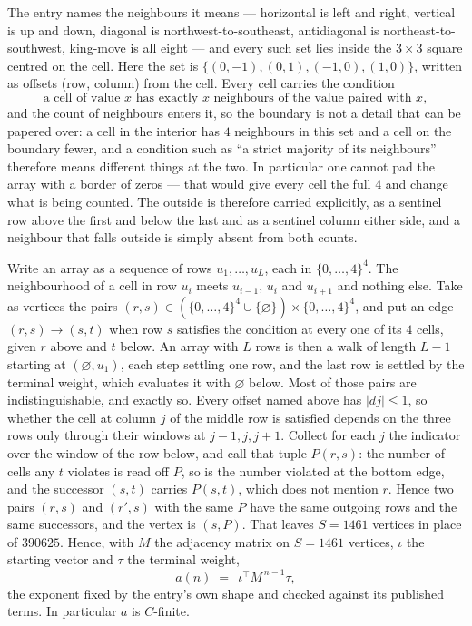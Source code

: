 \documentclass[11pt,a4paper]{article}
\theoremstyle{plain}
\theoremstyle{definition}
\begin{document}
The entry names the neighbours it means --- horizontal is left and right, vertical is up and
down, diagonal is northwest-to-southeast, antidiagonal is northeast-to-southwest, king-move is
all eight --- and every such set lies inside the $3\times3$ square centred on the cell. Here
the set is $\{(0,-1), (0,1), (-1,0), (1,0)\}$, written as offsets (row, column) from the cell. Every cell carries
the condition
\[
\text{a cell of value }x\text{ has exactly }x\text{ neighbours of the value paired with }x,
\]
and the count of neighbours enters it, so the boundary is not a detail that can be papered
over: a cell in the interior has $4$ neighbours in this set and a cell on the boundary
fewer, and a condition such as ``a strict majority of its neighbours'' therefore means
different things at the two. In particular one cannot pad the array with a border of zeros ---
that would give every cell the full $4$ and change what is being counted. The outside is
therefore carried
explicitly, as a sentinel row above the first and below the last and as a sentinel column
either side, and a neighbour that falls outside is simply absent from both counts.

Write an array as a sequence of rows $u_1,\dots,u_L$, each in
$\{0,\dots,4\}^{4}$. The neighbourhood of a cell in row $u_i$ meets $u_{i-1}$,
$u_i$ and $u_{i+1}$ and nothing else. Take as vertices the pairs
$(r,s)\in(\{0,\dots,4\}^{4}\cup\{\varnothing\})\times\{0,\dots,4\}^{4}$,
and put an edge $(r,s)\to(s,t)$ when row $s$ satisfies the condition at every one of its
$4$ cells, given $r$ above and $t$ below. An array with $L$ rows is then a walk of length
$L-1$ starting at $(\varnothing,u_1)$, each step settling one row, and the last row is
settled by the terminal weight, which evaluates it with $\varnothing$ below. Most of those pairs are indistinguishable, and exactly so. Every offset named above has $|dj|\le 1$, so whether the cell at column $j$ of the middle row is satisfied depends on the three rows only through their windows at $j-1,j,j+1$. Collect for each $j$ the indicator over the window of the row below, and call that tuple $P(r,s)$: the number of cells any $t$ violates is read off $P$, so is the number violated at the bottom edge, and the successor $(s,t)$ carries $P(s,t)$, which does not mention $r$. Hence two pairs $(r,s)$ and $(r',s)$ with the same $P$ have the same outgoing rows and the same successors, and the vertex is $(s,P)$. That leaves $S=1461$ vertices in place of $390625$. Hence,
with $M$ the adjacency matrix on $S=1461$ vertices, $\iota$ the starting vector and $\tau$ the
terminal weight,
\[
a(n)\;=\;\,\iota^{\!\top}M^{\,n-1}\tau ,
\]
the exponent fixed by the entry's own shape and checked against its published terms. In
particular $a$ is $C$-finite.
\end{document}
